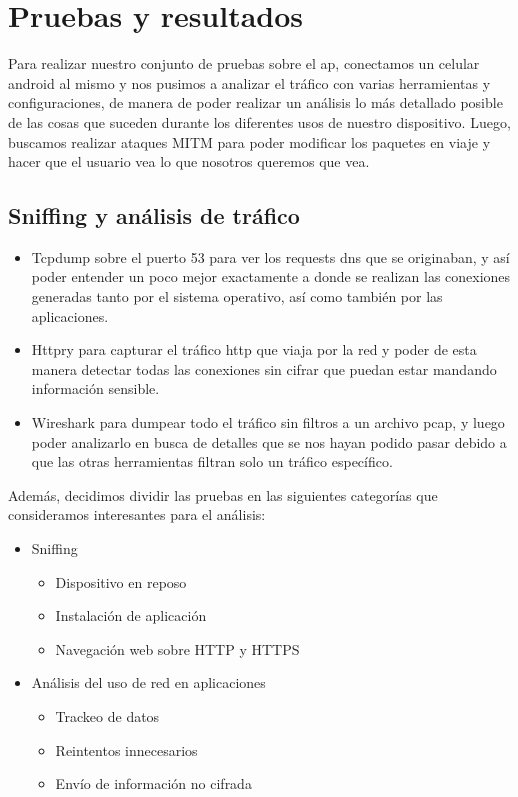\section{Pruebas y resultados}

Para realizar nuestro conjunto de pruebas sobre el ap, conectamos un celular android al mismo y nos pusimos a analizar el tráfico 
con varias herramientas y configuraciones, de manera de poder realizar un análisis lo más detallado posible de las cosas que suceden
durante los diferentes usos de nuestro dispositivo. Luego, buscamos realizar ataques MITM para poder modificar los paquetes en viaje
y hacer que el usuario vea lo que nosotros queremos que vea.

\subsection{Sniffing y análisis de tráfico}

\begin{itemize}
  \item Tcpdump sobre el puerto 53 para ver los requests dns que se originaban, y así poder entender un poco mejor exactamente a donde se
  realizan las conexiones generadas tanto por el sistema operativo, así como también por las aplicaciones.
  \item Httpry para capturar el tráfico http que viaja por la red y poder de esta manera detectar todas las conexiones sin cifrar que puedan 
  estar mandando información sensible.
  \item Wireshark para dumpear todo el tráfico sin filtros a un archivo pcap, y luego poder analizarlo en busca de detalles que se nos hayan
  podido pasar debido a que las otras herramientas filtran solo un tráfico específico.
\end{itemize}

Además, decidimos dividir las pruebas en las siguientes categorías que consideramos interesantes para el análisis:

\begin{itemize}
  \item Sniffing
  \begin{itemize}
    \item Dispositivo en reposo
    \item Instalación de aplicación
    \item Navegación web sobre HTTP y HTTPS
  \end{itemize}
  \item Análisis del uso de red en aplicaciones
  \begin{itemize}
    \item Trackeo de datos
    \item Reintentos innecesarios
    \item Envío de información no cifrada
  \end{itemize}
\end{itemize}



